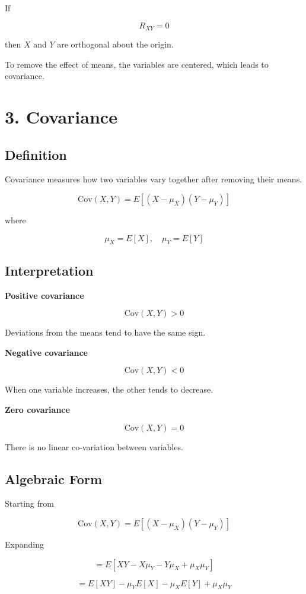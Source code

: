 \documentclass[11pt]{article}
\begin{document}
If

\[
R_{XY}=0
\]

then $X$ and $Y$ are orthogonal about the origin.

To remove the effect of means, the variables are centered, which leads to covariance.

\section*{3. Covariance}

\subsection*{Definition}

Covariance measures how two variables vary together after removing their means.

\[
\text{Cov}(X,Y) = E[(X-\mu_X)(Y-\mu_Y)]
\]

where

\[
\mu_X = E[X], \quad \mu_Y = E[Y]
\]

\subsection*{Interpretation}

\textbf{Positive covariance}

\[
\text{Cov}(X,Y) > 0
\]

Deviations from the means tend to have the same sign.

\textbf{Negative covariance}

\[
\text{Cov}(X,Y) < 0
\]

When one variable increases, the other tends to decrease.

\textbf{Zero covariance}

\[
\text{Cov}(X,Y) = 0
\]

There is no linear co-variation between variables.

\subsection*{Algebraic Form}

Starting from

\[
\text{Cov}(X,Y) = E[(X-\mu_X)(Y-\mu_Y)]
\]

Expanding

\[
= E[XY - X\mu_Y - Y\mu_X + \mu_X\mu_Y]
\]

\[
= E[XY] - \mu_YE[X] - \mu_XE[Y] + \mu_X\mu_Y
\]
\end{document}
